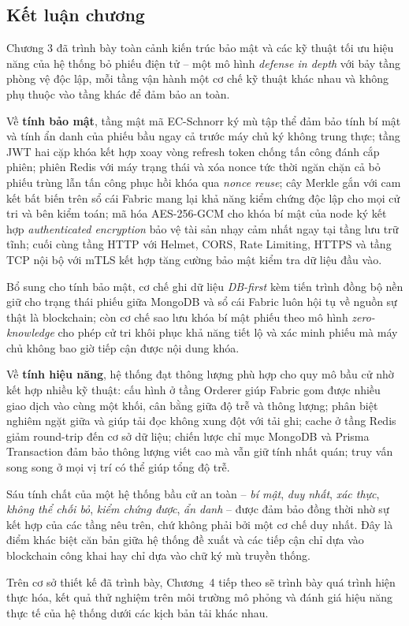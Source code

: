 \subsection{Kết luận chương}

Chương 3 đã trình bày toàn cảnh kiến trúc bảo mật và các kỹ thuật tối ưu hiệu năng của hệ thống bỏ phiếu điện tử -- một mô hình \textit{defense in depth} với bảy tầng phòng vệ độc lập, mỗi tầng vận hành một cơ chế kỹ thuật khác nhau và không phụ thuộc vào tầng khác để đảm bảo an toàn.

Về \textbf{tính bảo mật}, tầng mật mã EC-Schnorr ký mù tập thể đảm bảo tính bí mật và tính ẩn danh của phiếu bầu ngay cả trước máy chủ ký không trung thực; tầng JWT hai cặp khóa kết hợp xoay vòng refresh token chống tấn công đánh cắp phiên; phiên Redis với máy trạng thái và xóa nonce tức thời ngăn chặn cả bỏ phiếu trùng lẫn tấn công phục hồi khóa qua \textit{nonce reuse}; cây Merkle gắn với cam kết bất biến trên sổ cái Fabric mang lại khả năng kiểm chứng độc lập cho mọi cử tri và bên kiểm toán; mã hóa AES-256-GCM cho khóa bí mật của node ký kết hợp \textit{authenticated encryption} bảo vệ tài sản nhạy cảm nhất ngay tại tầng lưu trữ tĩnh; cuối cùng tầng HTTP với Helmet, CORS, Rate Limiting, HTTPS và tầng TCP nội bộ với mTLS kết hợp  tăng cường bảo mật kiểm tra dữ liệu đầu vào.

Bổ sung cho tính bảo mật, cơ chế ghi dữ liệu \textit{DB-first} kèm tiến trình đồng bộ nền giữ cho trạng thái phiếu giữa MongoDB và sổ cái Fabric luôn hội tụ về nguồn sự thật là blockchain; còn cơ chế sao lưu khóa bí mật phiếu theo mô hình \textit{zero-knowledge} cho phép cử tri khôi phục khả năng tiết lộ và xác minh phiếu mà máy chủ không bao giờ tiếp cận được nội dung khóa.

Về \textbf{tính hiệu năng}, hệ thống đạt thông lượng phù hợp cho quy mô bầu cử nhờ kết hợp nhiều kỹ thuật: cấu hình  ở tầng Orderer giúp Fabric gom được nhiều giao dịch vào cùng một khối, cân bằng giữa độ trễ và thông lượng; phân biệt nghiêm ngặt giữa  và  giúp tải đọc không xung đột với tải ghi; cache ở tầng Redis giảm round-trip đến cơ sở dữ liệu; chiến lược chỉ mục MongoDB và Prisma Transaction đảm bảo thông lượng viết cao mà vẫn giữ tính nhất quán; truy vấn song song ở mọi vị trí có thể giúp tổng độ trễ.

Sáu tính chất của một hệ thống bầu cử an toàn -- \textit{bí mật}, \textit{duy nhất}, \textit{xác thực}, \textit{không thể chối bỏ}, \textit{kiểm chứng được}, \textit{ẩn danh} -- được đảm bảo đồng thời nhờ sự kết hợp của các tầng nêu trên, chứ không phải bởi một cơ chế duy nhất. Đây là điểm khác biệt căn bản giữa hệ thống đề xuất và các tiếp cận chỉ dựa vào blockchain công khai hay chỉ dựa vào chữ ký mù truyền thống.

Trên cơ sở thiết kế đã trình bày, Chương~4 tiếp theo sẽ trình bày quá trình hiện thực hóa, kết quả thử nghiệm trên môi trường mô phỏng và đánh giá hiệu năng thực tế của hệ thống dưới các kịch bản tải khác nhau.
